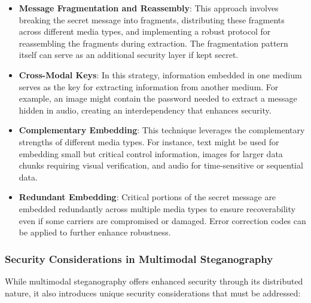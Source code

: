 \documentclass[12pt, a4paper, oneside]{book}
\begin{document}
\begin{itemize}[leftmargin=*]
    \item \textbf{Message Fragmentation and Reassembly}: This approach involves breaking the secret message into fragments, distributing these fragments across different media types, and implementing a robust protocol for reassembling the fragments during extraction. The fragmentation pattern itself can serve as an additional security layer if kept secret.

    \item \textbf{Cross-Modal Keys}: In this strategy, information embedded in one medium serves as the key for extracting information from another medium. For example, an image might contain the password needed to extract a message hidden in audio, creating an interdependency that enhances security.

    \item \textbf{Complementary Embedding}: This technique leverages the complementary strengths of different media types. For instance, text might be used for embedding small but critical control information, images for larger data chunks requiring visual verification, and audio for time-sensitive or sequential data.

    \item \textbf{Redundant Embedding}: Critical portions of the secret message are embedded redundantly across multiple media types to ensure recoverability even if some carriers are compromised or damaged. Error correction codes can be applied to further enhance robustness.
\end{itemize}

\subsubsection{Security Considerations in Multimodal Steganography}
While multimodal steganography offers enhanced security through its distributed nature, it also introduces unique security considerations that must be addressed:
\end{document}
